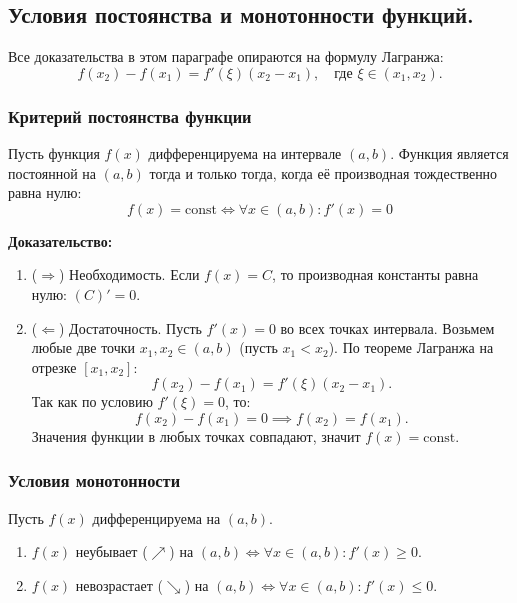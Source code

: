 \subsection{Условия постоянства и монотонности функций.}

Все доказательства в этом параграфе опираются на формулу Лагранжа:
\[ f(x_2) - f(x_1) = f'(\xi)(x_2 - x_1), \quad \text{где } \xi \in (x_1, x_2). \]

\subsubsection*{Критерий постоянства функции}

\begin{tcolorbox}[title=Теорема (Критерий постоянства)]
    Пусть функция $f(x)$ дифференцируема на интервале $(a, b)$.
    Функция является постоянной на $(a, b)$ тогда и только тогда, когда её производная тождественно равна нулю:
    \[ f(x) = \text{const} \iff \forall x \in (a, b): f'(x) = 0 \]
\end{tcolorbox}

\textbf{Доказательство:}
\begin{enumerate}
    \item ($\Rightarrow$) Необходимость.
    Если $f(x) = C$, то производная константы равна нулю: $(C)' = 0$.
    
    \item ($\Leftarrow$) Достаточность.
    Пусть $f'(x) = 0$ во всех точках интервала.
    Возьмем любые две точки $x_1, x_2 \in (a, b)$ (пусть $x_1 < x_2$).
    По теореме Лагранжа на отрезке $[x_1, x_2]$:
    \[ f(x_2) - f(x_1) = f'(\xi)(x_2 - x_1). \]
    Так как по условию $f'(\xi) = 0$, то:
    \[ f(x_2) - f(x_1) = 0 \implies f(x_2) = f(x_1). \]
    Значения функции в любых точках совпадают, значит $f(x) = \text{const}$.
\end{enumerate}

\subsubsection*{Условия монотонности}

\begin{tcolorbox}[title=Теорема (Критерий монотонности)]
    Пусть $f(x)$ дифференцируема на $(a, b)$.
    \begin{enumerate}
        \item $f(x)$ неубывает ($\nearrow$) на $(a, b) \iff \forall x \in (a, b): f'(x) \ge 0$.
        \item $f(x)$ невозрастает ($\searrow$) на $(a, b) \iff \forall x \in (a, b): f'(x) \le 0$.
    \end{enumerate}
\end{tcolorbox}

